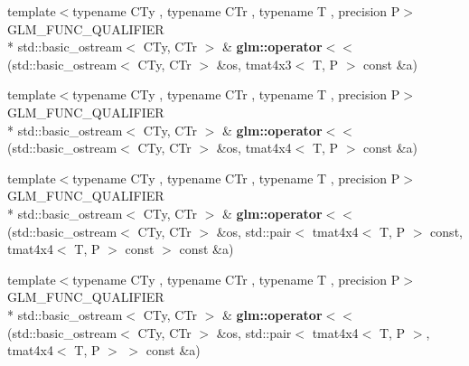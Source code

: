 \begin{DoxyCompactItemize}
\item 
\hypertarget{group__gtx__io_gaca75b14a0534a02860349a114a10aa44}{{\footnotesize template$<$typename C\-Ty , typename C\-Tr , typename T , precision P$>$ }\\G\-L\-M\-\_\-\-F\-U\-N\-C\-\_\-\-Q\-U\-A\-L\-I\-F\-I\-E\-R \\*
std\-::basic\-\_\-ostream$<$ C\-Ty, C\-Tr $>$ \& {\bfseries glm\-::operator$<$$<$} (std\-::basic\-\_\-ostream$<$ C\-Ty, C\-Tr $>$ \&os, tmat4x3$<$ T, P $>$ const \&a)}\label{group__gtx__io_gaca75b14a0534a02860349a114a10aa44}

\item 
\hypertarget{group__gtx__io_ga6683acc91ba7ce5822e25a2517550bff}{{\footnotesize template$<$typename C\-Ty , typename C\-Tr , typename T , precision P$>$ }\\G\-L\-M\-\_\-\-F\-U\-N\-C\-\_\-\-Q\-U\-A\-L\-I\-F\-I\-E\-R \\*
std\-::basic\-\_\-ostream$<$ C\-Ty, C\-Tr $>$ \& {\bfseries glm\-::operator$<$$<$} (std\-::basic\-\_\-ostream$<$ C\-Ty, C\-Tr $>$ \&os, tmat4x4$<$ T, P $>$ const \&a)}\label{group__gtx__io_ga6683acc91ba7ce5822e25a2517550bff}

\item 
\hypertarget{group__gtx__io_ga112ff562e10c18929151d17e711e27a7}{{\footnotesize template$<$typename C\-Ty , typename C\-Tr , typename T , precision P$>$ }\\G\-L\-M\-\_\-\-F\-U\-N\-C\-\_\-\-Q\-U\-A\-L\-I\-F\-I\-E\-R \\*
std\-::basic\-\_\-ostream$<$ C\-Ty, C\-Tr $>$ \& {\bfseries glm\-::operator$<$$<$} (std\-::basic\-\_\-ostream$<$ C\-Ty, C\-Tr $>$ \&os, std\-::pair$<$ tmat4x4$<$ T, P $>$ const, tmat4x4$<$ T, P $>$ const  $>$ const \&a)}\label{group__gtx__io_ga112ff562e10c18929151d17e711e27a7}

\item 
\hypertarget{group__gtx__io_gad09c7114641975d778243bd4379a3ea5}{{\footnotesize template$<$typename C\-Ty , typename C\-Tr , typename T , precision P$>$ }\\G\-L\-M\-\_\-\-F\-U\-N\-C\-\_\-\-Q\-U\-A\-L\-I\-F\-I\-E\-R \\*
std\-::basic\-\_\-ostream$<$ C\-Ty, C\-Tr $>$ \& {\bfseries glm\-::operator$<$$<$} (std\-::basic\-\_\-ostream$<$ C\-Ty, C\-Tr $>$ \&os, std\-::pair$<$ tmat4x4$<$ T, P $>$, tmat4x4$<$ T, P $>$ $>$ const \&a)}\label{group__gtx__io_gad09c7114641975d778243bd4379a3ea5}

\end{DoxyCompactItemize}


